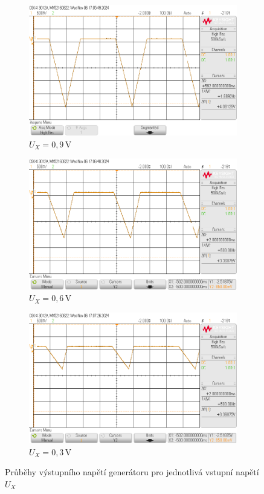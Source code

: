 \documentclass[a4paper, czech]{article}
\begin{document}
\begin{figure}[H]
    \centering
    \begin{subfigure}{0.49\textwidth}
        \includegraphics[width=\textwidth]{osc_6B_1.png}
        \caption{$U_X = 0,9\,$V}
    \end{subfigure}
    \hfil
    \begin{subfigure}{0.49\textwidth}
        \includegraphics[width=\textwidth]{osc_6B_2.png}
        \caption{$U_X = 0,6\,$V}
    \end{subfigure}

    \begin{subfigure}{0.49\textwidth}
        \includegraphics[width=\textwidth]{osc_6B_3.png}
        \caption{$U_X = 0,3\,$V}
    \end{subfigure}
    \caption{Průběhy výstupního napětí generátoru pro jednotlivá vstupní napětí $U_X$}
\end{figure}
\end{document}
